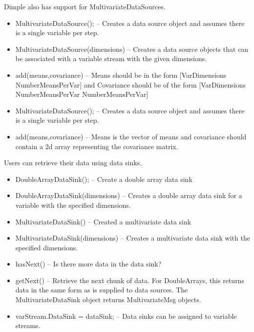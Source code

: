 Dimple also has support for MultivariateDataSources.

\ifmatlab
\begin{itemize}
\item MultivariateDataSource(); -- Creates a data source object and assumes there is a single variable per step.
\item MultivariateDataSource(dimensions) -- Creates a data source objects that can be associated with a variable stream with the given dimensions.
\item add(means,covariance) -- Means should be in the form [VarDimensions NumberMeansPerVar] and Covariance should be of the form [VarDimensions NumberMeansPerVar NumberMeansPerVar] 
\end{itemize}
\fi

\ifjava
\begin{itemize}
\item MultivariateDataSource(); -- Creates a data source object and assumes there is a single variable per step.
\item add(means,covariance) -- Means is the vector of means and covariance should contain a 2d array representing the covariance matrix.
\end{itemize}
\fi


Users can retrieve their data using data sinks.

\ifmatlab
\begin{itemize}
\item DoubleArrayDataSink(); -- Create a double array data sink
\item DoubleArrayDataSink(dimensions) -- Creates a double array data sink for a variable with the specified dimensions.
\item MultivariateDataSink() -- Created a multivariate data sink
\item MultivariateDataSink(dimensions) -- Creates a multivariate data sink with the specified dimensions.
\item hasNext() -- Is there more data in the data sink?
\item getNext() -- Retrieve the next chunk of data.  For DoubleArrays, this returns data in the same form as is supplied to data sources.  The MultivariateDataSink object returns MultivariateMsg objects.
\item varStream.DataSink = dataSink; -- Data sinks can be assigned to variable streams.
\end{itemize}
\fi


